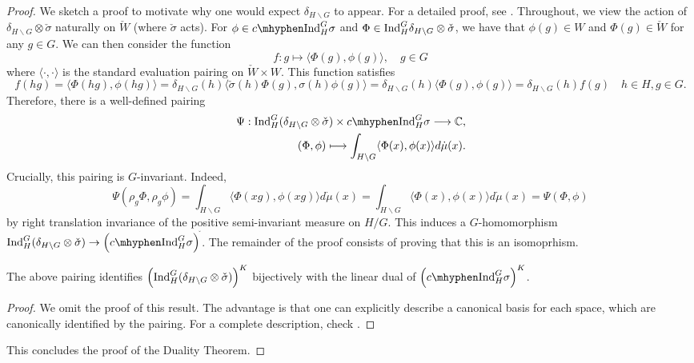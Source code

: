 \begin{proof}
    We sketch a proof to motivate why one would expect $\delta_{H\backslash G}$ to appear. For a detailed proof, see \cite[Theorem 3.5]{BH1}.
    Throughout, we view the action of $\delta_{H\backslash G}\otimes\check{\sigma}$ naturally on $\check{W}$ (where $\check{\sigma}$ acts). For $\phi\in \cInd_H^G\sigma$ and $\Phi\in\mathrm{Ind}_H^G\delta_{H\backslash G}\otimes\check{\sigma}$, 
    we have that $\phi(g)\in W$ and $\Phi(g)\in\check{W}$ for any $g\in G$. We can then consider the function $$f:g\longmapsto\langle\Phi(g),\phi(g)\rangle,\quad g\in G $$ 
    where $\langle\cdot,\cdot\rangle$ is the standard evaluation pairing on $\check{W}\times W$. This function satisfies 
    $$f(hg)=\langle\Phi(hg),\phi(hg)\rangle=\delta_{H\backslash G}(h)\langle\check{\sigma}(h)\Phi(g),\sigma(h)\phi(g)\rangle=\delta_{H\backslash G}(h)\langle\Phi(g),\phi(g)\rangle=\delta_{H\backslash G}(h)f(g)\quad h\in H, g\in G.$$
    Therefore, there is a well-defined pairing 
    \begin{align*}
        \Psi:\Ind_H^G(\delta_{H\backslash G}\otimes\check{\sigma})\times \cInd_H^G\sigma\longrightarrow\CC&,\\
        (\Phi,\phi)\longmapsto\int_{H\backslash G}\langle\Phi(x),\phi(x)\rangle d\dot{\mu}(x)&.
    \end{align*}
    Crucially, this pairing is $G$-invariant. Indeed, 
    $$\Psi(\rho_g\Phi,\rho_g\phi)=\int_{H\backslash G}\langle\Phi(xg),\phi(xg)\rangle d\dot{\mu}(x)=\int_{H\backslash G}\langle\Phi(x),\phi(x)\rangle d\dot{\mu}(x)=\Psi(\Phi,\phi)$$
    by right translation invariance of the positive semi-invariant measure on $H/G$. 
    This induces a $G$-homomorphism $\Ind_H^G(\delta_{H\backslash G}\otimes \check{\sigma})\to \left(\cInd_H^G\sigma \right)^{\check{}}$. The remainder of the proof consists of proving that this is an isomoprhism.

    \begin{lemma}
        The above pairing identifies $\left(\mathrm{Ind}_H^G(\delta_{H\backslash G}\otimes \check{\sigma})\right)^K$ bijectively with the linear dual of $\left(\cInd_H^G\sigma \right)^K$.
    \end{lemma}
    \begin{proof}
        We omit the proof of this result. The advantage is that one can explicitly describe a canonical basis for each space, which are canonically identified by the pairing. For a complete description, check \cite[Lemma 3.5.2]{BH1}.
    \end{proof}
    This concludes the proof of the Duality Theorem.
\end{proof}